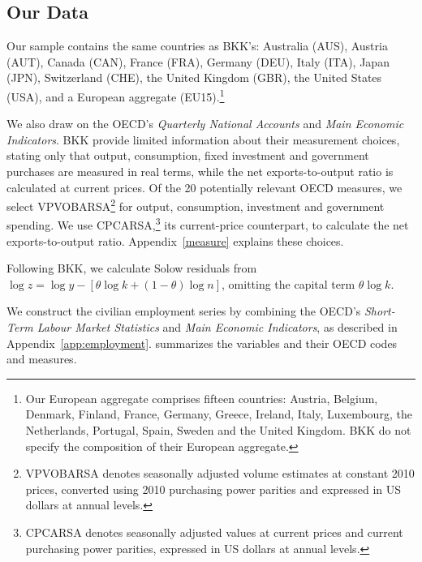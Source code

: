 \subsection{Our Data}

Our sample contains the same countries as BKK's: Australia (AUS), Austria (AUT), Canada (CAN), France (FRA), Germany (DEU), Italy (ITA), Japan (JPN), Switzerland (CHE), the United Kingdom (GBR), the United States (USA), and a European aggregate (EU15).\footnote{Our European aggregate comprises fifteen countries: Austria, Belgium, Denmark, Finland, France, Germany, Greece, Ireland, Italy, Luxembourg, the Netherlands, Portugal, Spain, Sweden and the United Kingdom. BKK do not specify the composition of their European aggregate.}

We also draw on the OECD's \textit{Quarterly National Accounts} and \textit{Main Economic Indicators}. BKK provide limited information about their measurement choices, stating only that output, consumption, fixed investment and government purchases are measured in real terms, while the net exports-to-output ratio is calculated at current prices. Of the 20 potentially relevant OECD measures, we select VPVOBARSA\footnote{VPVOBARSA denotes seasonally adjusted volume estimates at constant 2010 prices, converted using 2010 purchasing power parities and expressed in US dollars at annual levels.} for output, consumption, investment and government spending. We use CPCARSA,\footnote{CPCARSA denotes seasonally adjusted values at current prices and current purchasing power parities, expressed in US dollars at annual levels.} its current-price counterpart, to calculate the net exports-to-output ratio. Appendix~\ref{measure} explains these choices.

Following BKK, we calculate Solow residuals from $\log z = \log y - [\theta \log k + (1-\theta)\log n]$, omitting the capital term $\theta\log k$.

We construct the civilian employment series by combining the OECD's \textit{Short-Term Labour Market Statistics} and \textit{Main Economic Indicators}, as described in Appendix~\ref{app:employment}.  summarizes the variables and their OECD codes and measures.

